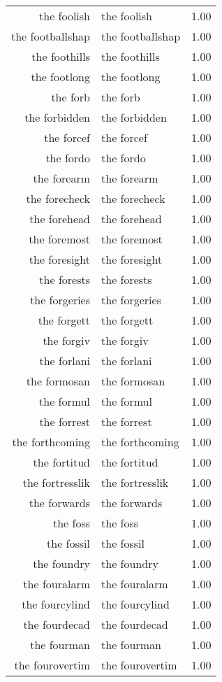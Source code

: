 \begin{table}[ht]
\begin{tabular}{rlr}
  the foolish & the foolish & 1.00 \\ 
  the footballshap & the footballshap & 1.00 \\ 
  the foothills & the foothills & 1.00 \\ 
  the footlong & the footlong & 1.00 \\ 
  the forb & the forb & 1.00 \\ 
  the forbidden & the forbidden & 1.00 \\ 
  the forcef & the forcef & 1.00 \\ 
  the fordo & the fordo & 1.00 \\ 
  the forearm & the forearm & 1.00 \\ 
  the forecheck & the forecheck & 1.00 \\ 
  the forehead & the forehead & 1.00 \\ 
  the foremost & the foremost & 1.00 \\ 
  the foresight & the foresight & 1.00 \\ 
  the forests & the forests & 1.00 \\ 
  the forgeries & the forgeries & 1.00 \\ 
  the forgett & the forgett & 1.00 \\ 
  the forgiv & the forgiv & 1.00 \\ 
  the forlani & the forlani & 1.00 \\ 
  the formosan & the formosan & 1.00 \\ 
  the formul & the formul & 1.00 \\ 
  the forrest & the forrest & 1.00 \\ 
  the forthcoming & the forthcoming & 1.00 \\ 
  the fortitud & the fortitud & 1.00 \\ 
  the fortresslik & the fortresslik & 1.00 \\ 
  the forwards & the forwards & 1.00 \\ 
  the foss & the foss & 1.00 \\ 
  the fossil & the fossil & 1.00 \\ 
  the foundry & the foundry & 1.00 \\ 
  the fouralarm & the fouralarm & 1.00 \\ 
  the fourcylind & the fourcylind & 1.00 \\ 
  the fourdecad & the fourdecad & 1.00 \\ 
  the fourman & the fourman & 1.00 \\ 
  the fourovertim & the fourovertim & 1.00 \\ 

\end{tabular}
\end{table}

